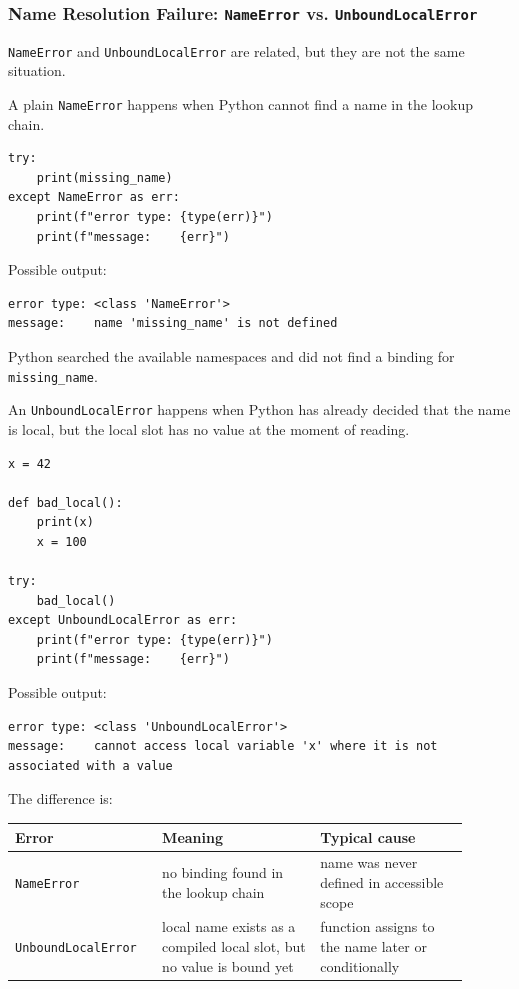 \subsubsection{Name Resolution Failure: \texttt{NameError} vs. \texttt{UnboundLocalError}}

\texttt{NameError} and \texttt{UnboundLocalError} are related, but they are not the same situation.

A plain \texttt{NameError} happens when Python cannot find a name in the lookup chain.

\begin{verbatim}
try:
    print(missing_name)
except NameError as err:
    print(f"error type: {type(err)}")
    print(f"message:    {err}")
\end{verbatim}

Possible output:

\begin{verbatim}
error type: <class 'NameError'>
message:    name 'missing_name' is not defined
\end{verbatim}

Python searched the available namespaces and did not find a binding for \texttt{missing\_name}.

An \texttt{UnboundLocalError} happens when Python has already decided that the name is local, but the local slot has no value at the moment of reading.

\begin{verbatim}
x = 42

def bad_local():
    print(x)
    x = 100

try:
    bad_local()
except UnboundLocalError as err:
    print(f"error type: {type(err)}")
    print(f"message:    {err}")
\end{verbatim}

Possible output:

\begin{verbatim}
error type: <class 'UnboundLocalError'>
message:    cannot access local variable 'x' where it is not associated with a value
\end{verbatim}

The difference is:

\begin{center}
\begin{tabular}{|p{0.28\linewidth}|p{0.32\linewidth}|p{0.30\linewidth}|}
\hline
\textbf{Error} & \textbf{Meaning} & \textbf{Typical cause} \\
\hline
\texttt{NameError} & no binding found in the lookup chain & name was never defined in accessible scope \\
\hline
\texttt{UnboundLocalError} & local name exists as a compiled local slot, but no value is bound yet & function assigns to the name later or conditionally \\
\hline
\end{tabular}
\end{center}


